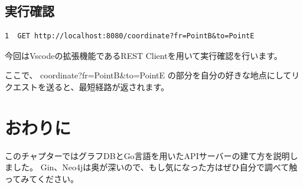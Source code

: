 \subsection{実行確認}

\begin{tcolorbox}[title=sample.http]
\begin{verbatim}
1  GET http://localhost:8080/coordinate?fr=PointB&to=PointE
\end{verbatim}
\end{tcolorbox}
今回はVscodeの拡張機能であるREST Clientを用いて実行確認を行います。

ここで、 coordinate?fr=PointB\&to=PointE の部分を自分の好きな地点にしてリクエストを送ると、最短経路が返されます。

\section{おわりに}
このチャプターではグラフDBとGo言語を用いたAPIサーバーの建て方を説明しました。
Gin、Neo4jは奥が深いので、もし気になった方はぜひ自分で調べて触ってみてください。
